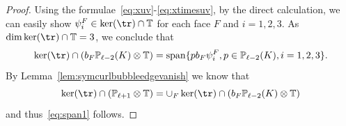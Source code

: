 \begin{proof}
Using the formulae~\eqref{eq:xuv}-\eqref{eq:xtimesuv}, by the direct calculation, we can easily show $\psi_i^F\in \ker(\tr)\cap \mathbb T$ for each face $F$ and $i=1,2,3$. As $\dim \ker(\tr)\cap \mathbb T = 3$, we conclude that
$$ \ker (\tr) \cap (b_F \mathbb P_{\ell-2}(K)\otimes \mathbb T) = {\rm span} \{ p b_F \psi_i^F, p\in \mathbb P_{\ell-2}(K), i = 1,2,3\}.$$
By Lemma~\ref{lem:symcurlbubbleedgevanish}  we know that 
$$
\ker(\tr)\cap (\mathbb P_{\ell+1}\otimes \mathbb T) =  \cup_F \ker(\tr)\cap (b_F \mathbb P_{\ell-2}(K)\otimes \mathbb T) 
$$
and thus~\eqref{eq:span1} follows. 
\end{proof}

